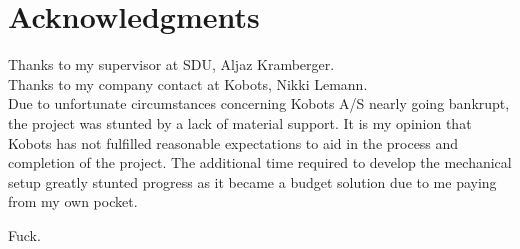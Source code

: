 \section{Acknowledgments}

Thanks to my supervisor at SDU, Aljaz Kramberger.\\
Thanks to my company contact at Kobots, Nikki Lemann.\\

Due to unfortunate circumstances concerning Kobots A/S nearly going bankrupt, the project was stunted by a lack of material support.
It is my opinion that Kobots has not fulfilled reasonable expectations to aid in the process and completion of the project. 
The additional time required to develop the mechanical setup greatly stunted progress as it became a budget solution due to me paying from my own pocket.

Fuck. 
